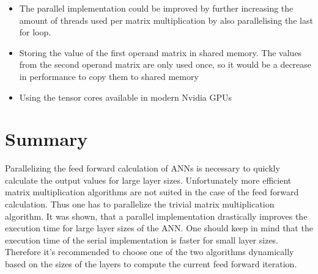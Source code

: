 \documentclass[sigconf]{acmart}
\begin{document}
\begin{itemize}
    \item{The parallel implementation could be improved by further increasing the amount of threads used per matrix multiplication by also parallelising the last for loop.}
    \item{Storing the value of the first operand matrix in shared memory. The values from the second operand matrix are only used once, so it would be a decrease in performance to copy them to shared memory}
    \item{Using the tensor cores available in modern Nvidia GPUs}
\end{itemize}


\section{Summary}
Parallelizing the feed forward calculation of ANNs is necessary to quickly calculate the output values for large layer sizes.
Unfortunately more efficient matrix multiplication algorithms are not suited in the case of the feed forward calculation. Thus one has to parallelize the trivial
matrix multiplication algorithm.
It was shown, that a parallel implementation drastically improves the execution time for large layer sizes of the ANN.
One should keep in mind that the execution time of the serial implementation is faster for small layer sizes. Therefore it's recommended to choose one of the two algorithms dynamically
based on the sizes of the layers to compute the current feed forward iteration.
\end{document}

